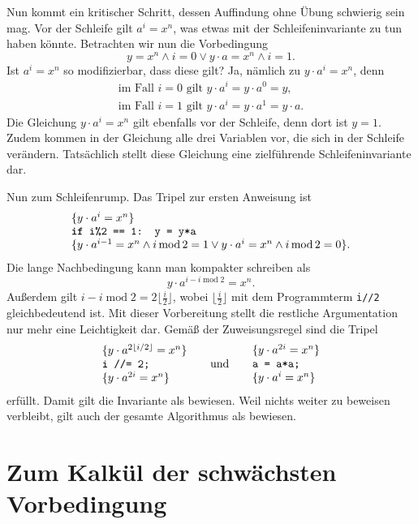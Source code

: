 Nun kommt ein kritischer Schritt, dessen Auffindung ohne Übung schwierig
sein mag. Vor der Schleife gilt $a^i=x^n$, was etwas mit der
Schleifeninvariante zu tun haben könnte. Betrachten wir nun die Vorbedingung
\[y = x^n\land i = 0\lor y\cdot a = x^n\land i = 1.\]
Ist $a^i=x^n$ so modifizierbar, dass diese gilt? Ja, nämlich zu
$y\cdot a^i=x^n$, denn
\begin{gather*}
\text{im Fall $i = 0$ gilt $y\cdot a^i = y\cdot a^0 = y$},\\
\text{im Fall $i = 1$ gilt $y\cdot a^i = y\cdot a^1 = y\cdot a$}.
\end{gather*}
Die Gleichung $y\cdot a^i=x^n$ gilt ebenfalls vor der Schleife, denn
dort ist $y=1$. Zudem kommen in der Gleichung alle drei Variablen vor,
die sich in der Schleife verändern. Tatsächlich stellt diese Gleichung eine
zielführende Schleifeninvariante dar.

Nun zum Schleifenrump. Das Tripel zur ersten Anweisung ist
\[\begin{array}{l}
\{y\cdot a^i = x^n\}\\
\text{\texttt{\textbf{if} i\%2 == 1: y = y*a}}\\
\{y\cdot a^{i-1} = x^n\land i\operatorname{mod} 2 = 1
\lor y\cdot a^i = x^n\land i\operatorname{mod}2 = 0\}.
\end{array}\]
Die lange Nachbedingung kann man kompakter schreiben als
\[y\cdot a^{i-i\operatorname{mod}2} = x^n.\]
Außerdem gilt $i-i\operatorname{mod}2 = 2\lfloor\frac{i}{2}\rfloor$,
wobei $\lfloor\frac{i}{2}\rfloor$ mit dem Programmterm \texttt{i//2}
gleichbedeutend ist. Mit dieser Vorbereitung stellt die restliche
Argumentation nur mehr eine Leichtigkeit dar. Gemäß der Zuweisungsregel
sind die Tripel
\[\begin{array}{l}
\{y\cdot a^{2\lfloor i/2\rfloor} = x^n\}\\
\text{\texttt{i //= 2;}}\\
\{y\cdot a^{2i} = x^n\}
\end{array}
\quad\;\;\text{und}\quad\;\;
\begin{array}{l}
\{y\cdot a^{2i} = x^n\}\\
\text{\texttt{a = a*a;}}\\
\{y\cdot a^i = x^n\}
\end{array}\]
erfüllt. Damit gilt die Invariante als bewiesen. Weil nichts weiter zu
beweisen verbleibt, gilt auch der gesamte Algorithmus als bewiesen.

\section{Zum Kalkül der schwächsten Vorbedingung}

